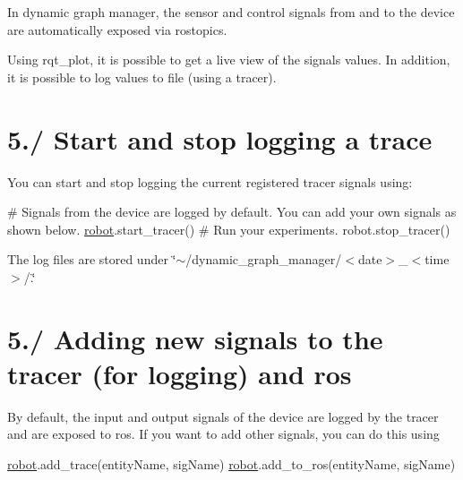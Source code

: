 In dynamic graph manager, the sensor and control signals from and to the device are automatically exposed via rostopics.

Using rqt\+\_\+plot, it is possible to get a live view of the signals\textquotesingle{} values. In addition, it is possible to log values to file (using a tracer).\hypertarget{subpage_plot_plot_sec_tracer}{}\section{5./ Start and stop logging a trace}\label{subpage_plot_plot_sec_tracer}
You can start and stop logging the current registered tracer signals using\+: 
\begin{DoxyCode}
\textcolor{preprocessor}{# Signals from the device are logged by default. You can add your own signals as shown below.}
\hyperlink{namespacerobot}{robot}.start\_tracer()
\textcolor{preprocessor}{# Run your experiments.}
\textcolor{preprocessor}{robot.stop\_tracer()}
\end{DoxyCode}
 The log files are stored under \char`\"{}$\sim$/dynamic\+\_\+graph\+\_\+manager/$<$date$>$\+\_\+$<$time$>$/.\char`\"{}\hypertarget{subpage_plot_plot_sec_add_trace}{}\section{5./ Adding new signals to the tracer (for logging) and ros}\label{subpage_plot_plot_sec_add_trace}
By default, the input and output signals of the device are logged by the tracer and are exposed to ros. If you want to add other signals, you can do this using 
\begin{DoxyCode}
\hyperlink{namespacerobot}{robot}.add\_trace(entityName, sigName)
\hyperlink{namespacerobot}{robot}.add\_to\_ros(entityName, sigName)
\end{DoxyCode}


